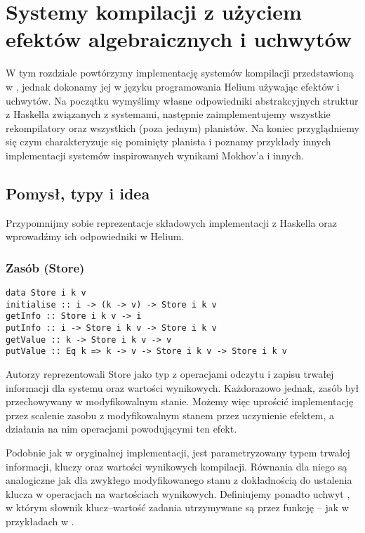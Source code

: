 
\chapter{Systemy kompilacji z użyciem efektów algebraicznych i uchwytów}
\label{chapter-bsue}

W tym rozdziale powtórzymy implementację systemów kompilacji przedstawioną w \BSaLC\cite{mokhov2018build}, jednak dokonamy jej w języku programowania Helium używając efektów i uchwytów. Na początku wymyślimy własne odpowiedniki abstrakcyjnych struktur z Haskella związanych z systemami, następnie zaimplementujemy wszystkie rekompilatory oraz wszystkich (poza jednym) planistów. Na koniec przyglądniemy się czym charakteryzuje się pominięty planista i poznamy przykłady innych implementacji systemów inspirowanych wynikami Mokhov'a i innych.

\section{Pomysł, typy i idea}

Przypomnijmy sobie reprezentacje składowych implementacji z Haskella oraz wprowadźmy ich odpowiedniki w Helium.

\subsection{Zasób (Store)}

\begin{lstlisting}[style=haskell-style]
data Store i k v
initialise :: i -> (k -> v) -> Store i k v
getInfo :: Store i k v -> i
putInfo :: i -> Store i k v -> Store i k v
getValue :: k -> Store i k v -> v
putValue :: Eq k => k -> v -> Store i k v -> Store i k v
\end{lstlisting}

Autorzy \BSaLC\cite{mokhov2018build} reprezentowali Store jako typ z operacjami odczytu i zapisu trwałej informacji dla systemu oraz wartości wynikowych. Każdorazowo jednak, zasób był przechowywany w modyfikowalnym stanie. Możemy więc uprościć implementację przez scalenie zasobu z modyfikowalnym stanem przez uczynienie  efektem, a działania na nim operacjami powodującymi ten efekt.



Podobnie jak  w oryginalnej implementacji,  jest parametryzowany typem trwałej informacji, kluczy oraz wartości wynikowych kompilacji. Równania dla niego są analogiczne jak dla zwykłego modyfikowanego stanu z dokładnością do ustalenia klucza w operacjach na wartościach wynikowych. Definiujemy ponadto uchwyt , w którym słownik klucz--wartość zadania utrzymywane są przez funkcję -- jak w przykładach w \BSaLC{}.

